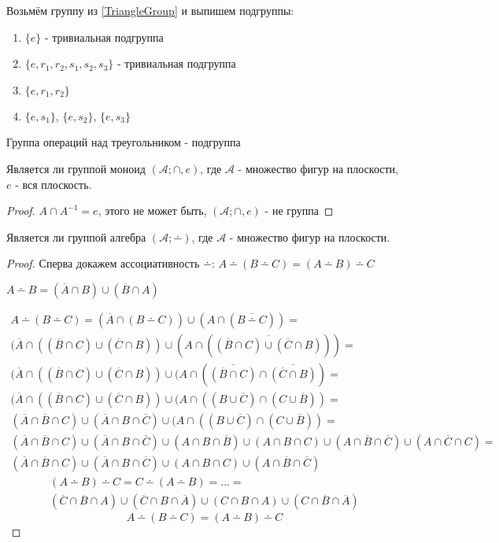 \documentclass[../main/document.tex]{subfiles}
\begin{document}
\begin{exm}

Возьмём группу из \ref{TriangleGroup} и выпишем подгруппы:
\begin{enumerate}
\item $\{e\}$ - тривиальная подгруппа
\item $\{e,r_1,r_2,s_1,s_2,s_3\}$ - тривиальная подгруппа
\item $\{e,r_1,r_2\}$
\item $\{e,s_1\}$, $\{e,s_2\}$, $\{e,s_3\}$
\end{enumerate}
\end{exm}
\begin{exm}
Группа операций над треугольником - подгруппа
\end{exm}
\begin{exm}
Является ли группой моноид $(\mathcal{A};\cap,e)$, где $\mathcal{A}$ - множество фигур на плоскости, $e$ - вся плоскость.
\begin{proof}
$A\cap A^{-1}=e$, этого не может быть, $(\mathcal{A};\cap,e)$ - не группа
\end{proof}
Является ли группой алгебра $(\mathcal{A};\dotminus)$, где $\mathcal{A}$ - множество фигур на плоскости.
\begin{proof}
Сперва докажем ассоциативность $\dotminus$: $A\dotminus (B\dotminus C)=(A\dotminus B)\dotminus C$

$A\dotminus B=(\overline{A}\cap B)\cup(\overline{B}\cap A)$

\begin{multline*}
A\dotminus (B\dotminus C)=(\overline{A}\cap (B\dotminus C))\cup(A\cap (\overline{B\dotminus C}))=\\
(\overline{A}\cap ((\overline{B}\cap C)\cup(\overline{C}\cap B))\cup(A\cap (\overline{(\overline{B}\cap C)\cup(\overline{C}\cap B)}))=\\
(\overline{A}\cap ((\overline{B}\cap C)\cup(\overline{C}\cap B))\cup(A\cap
(\overline{(\overline{B}\cap C)}\cap \overline{(\overline{C}\cap B)})=\\
(\overline{A}\cap ((\overline{B}\cap C)\cup(\overline{C}\cap B))\cup(A\cap
((B\cup \overline{C})\cap (C\cup \overline{B}))=\\
(\overline{A}\cap \overline{B}\cap C)\cup (\overline{A}\cap B\cap \overline{C})
\cup(A\cap
((B\cup \overline{C})\cap (C\cup \overline{B}))=\\
(\overline{A}\cap \overline{B}\cap C)\cup (\overline{A}\cap B\cap \overline{C})
\cup
(A\cap B\cap \overline{B})\cup (A\cap B\cap C)\cup (A\cap \overline{B}\cap \overline{C})\cup (A\cap \overline{C}\cap C)=\\
(\overline{A}\cap \overline{B}\cap C)\cup (\overline{A}\cap B\cap \overline{C})
\cup
(A\cap B\cap C)\cup (A\cap \overline{B}\cap \overline{C})
\end{multline*}
\begin{multline*}
(A\dotminus B)\dotminus C=C\dotminus (A\dotminus B)=...=\\
(\overline{C}\cap \overline{B}\cap A)\cup (\overline{C}\cap B\cap \overline{A})
\cup
(C\cap B\cap A)\cup (C\cap \overline{B}\cap \overline{A})
\end{multline*}
$$A\dotminus (B\dotminus C)=(A\dotminus B)\dotminus C$$


\end{proof}
\end{exm}
\end{document}
